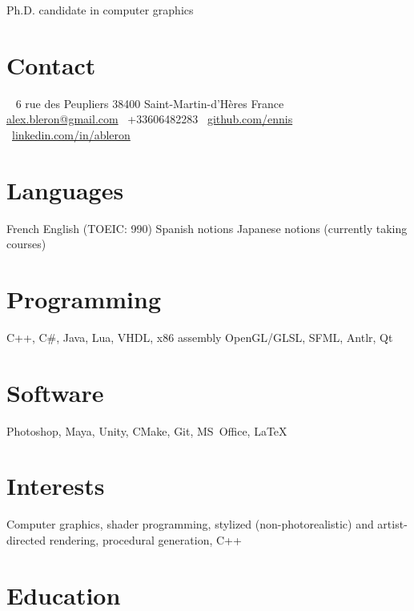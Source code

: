 \documentclass[]{friggeri-cv}
\begin{document}
       {Ph.D. candidate in computer graphics}


\begin{aside}
  \section{Contact}
   \faMapMarker~ 6 rue des Peupliers
    38400 Saint-Martin-d'Hères
    France
    ~
    \faEnvelope~ \href{mailto:alex.bleron@gmail.com}{alex.bleron@gmail.com}
\faMobile~+33606482283
\faGithub~\href{https://github.com/ennis}{github.com/ennis}
\faLinkedin~\href{https://www.linkedin.com/in/ableron}{linkedin.com/in/ableron}
  \section{Languages}
    French 
    English (TOEIC: 990)
    Spanish notions
    Japanese notions (currently taking courses)
  \section{Programming}
    C++, C\#, Java, Lua, VHDL, x86 assembly
    OpenGL/GLSL, SFML, 
    Antlr, Qt
    \section{Software}
    Photoshop, Maya, Unity, CMake, Git, MS~Office, \LaTeX
\end{aside}

\section{Interests}

Computer graphics, shader programming, stylized (non-photorealistic) and artist-directed rendering, procedural generation, C++

\section{Education}
\end{document}
